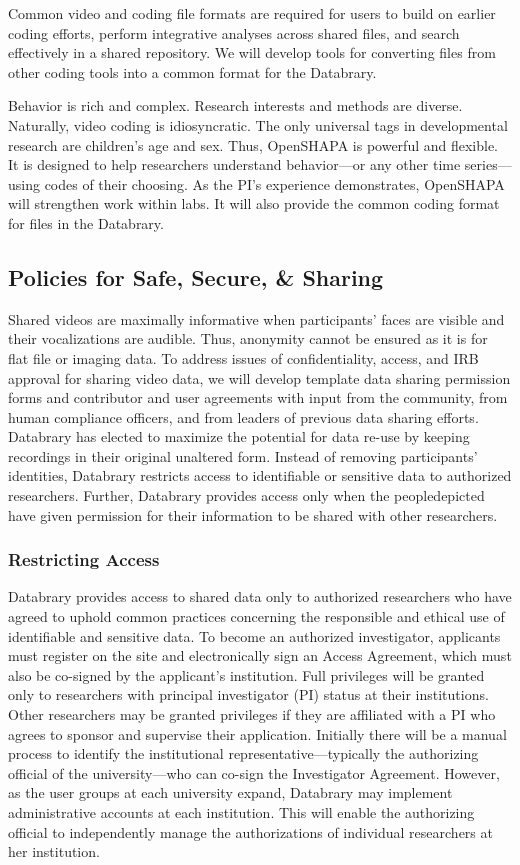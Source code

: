 \documentclass[letterpaper,man,apacite]{apa6}
\begin{document}
Common video and coding file formats are required for users to build on earlier coding efforts, perform integrative analyses across shared files, and search effectively in a shared repository. We will develop tools for converting files from other coding tools into a common format for the Databrary.

Behavior is rich and complex. Research interests and methods are diverse. Naturally, video coding is idiosyncratic. The only universal tags in developmental research are children’s age and sex. Thus, OpenSHAPA is powerful and flexible. It is designed to help researchers understand behavior—or any other time series—using codes of their choosing. As the PI's experience demonstrates, OpenSHAPA will strengthen work within labs. It will also provide the common coding format for files in the Databrary.
\subsection{Policies for Safe, Secure, \& Sharing}
Shared videos are maximally informative when participants’ faces are visible and their vocalizations are audible. Thus, anonymity cannot be ensured as it is for flat file or imaging data. 
To address issues of confidentiality, access, and IRB approval for sharing video data, we will develop template data sharing permission forms and contributor and user agreements with input from the community, from human compliance officers, and from leaders of previous data sharing efforts.
Databrary has elected to maximize the potential for data re-use by keeping recordings in their original
unaltered form. 
Instead of removing participants’ identities, Databrary restricts access to identifiable or sensitive data to authorized researchers. 
Further, Databrary provides access only when the peopledepicted have given permission for their information to be shared with other researchers.
\subsubsection{Restricting Access}
Databrary provides access to shared data only to authorized researchers who have agreed to uphold common practices concerning the responsible and ethical use of identifiable and sensitive data. 
To become an authorized investigator, applicants must register on the site and electronically sign an Access Agreement, which must also be co-signed by the applicant’s institution. 
Full privileges will be granted only to researchers with principal investigator (PI) status
at their institutions. 
Other researchers may be granted privileges if they are affiliated with a PI who agrees to sponsor and supervise their application. 
Initially there will be a manual process to identify the institutional representative—typically the authorizing official of the university—who can co-sign the Investigator Agreement. 
However, as the user groups at each university expand, Databrary may implement
administrative accounts at each institution. 
This will enable the authorizing official to independently manage the authorizations of
individual researchers at her institution.
\end{document}

